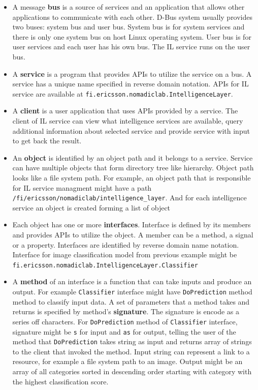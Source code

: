 \documentclass[english, 12pt, a4paper, elec, utf8, online]{aaltothesis}
\begin{document}
\begin{itemize}
\item
A message \textbf{bus} is a source of services and an application that allows other applications to communicate with each other. D-Bus system usually provides two buses: system bus and user bus. System bus is for system services and there is only one system bus on host Linux operating system. User bus is for user services and each user has his own bus. The IL service runs on the user bus.  
\item
A \textbf{service} is a program that provides APIs to utilize the service on a bus. A service has a unique name specified in reverse domain notation. APIs for IL service are available at \texttt{fi.ericsson.nomadiclab.IntelligenceLayer}.   
\item
A \textbf{client} is a user application that uses APIs provided by a service. The client of IL service can view what intelligence services are available, query additional information about selected service and provide service with input to get back the result.  
\item
An \textbf{object} is identified by an object path and it belongs to a service. Service can have multiple objects that form directory tree like hierarchy. Object path looks like a file system path. For example, an object path that is responsible for IL service managment might have a path \texttt{/fi/ericsson/nomadiclab/intelligence\_layer}. And for each intelligence service an object is created forming a list of object

\item
Each object has one or more \textbf{interfaces}. Interface is defined by its members and provides APIs to utilize the object. A member can be a method, a signal or a property. Interfaces are identified by reverse domain name notation. Interface for image classification  model from previous example might be \texttt{fi.ericsson.nomadiclab.IntelligenceLayer.Classifier}     
\item
A \textbf{method} of an interface is a function that can take inputs and produce an output. For example \texttt{Classifier} interface might have \texttt{DoPrediction} method method to classify input data. A set of parameters that a method takes and returns is specified by method's \textbf{signature}. The signature is encode as a series off characters. For \texttt{DoPrediction} method of \texttt{Classifier} interface, signature might be \texttt{s} for input and \texttt{as} for output, telling the user of the method that \texttt{DoPrediction} takes string as input and returns array of strings to the client that invoked the method. Input string can represent a link to a resource, for example a file system path to an image. Output might be an array of all categories sorted in descending order starting with category with the highest classification score.             

\end{itemize}
\end{document}

